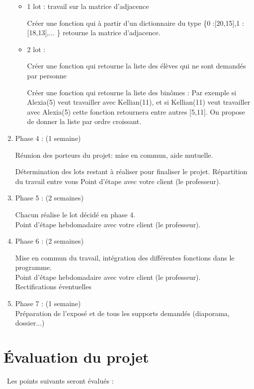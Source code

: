 \documentclass[12pt]{article}
\begin{document}
\begin{enumerate}
\begin{itemize}
\item [\textbullet] 1\ier{} lot : travail sur la matrice d’adjacence

Créer une fonction qui  à partir d’un dictionnaire du type \{0 :[20,15],1 :[18,13],... \} retourne la matrice d’adjacence.

\item [\textbullet] 2\ieme{} lot :

Créer une fonction qui retourne la liste des élèves qui ne sont demandés par personne

Créer une fonction qui retourne la liste des binômes : Par exemple si Alexia(5) veut travailler avec Kellian(11), et si Kellian(11) veut travailler avec Alexia(5) cette fonction retournera entre autres [5,11]. On propose de donner la liste par ordre croissant.



\medskip
\end{itemize}
\item Phase 4 : (1 semaine)  

Réunion des porteurs du projet: mise en commun, aide mutuelle.

Détermination des lots restant à réaliser pour finaliser le projet.  
Répartition du travail entre vous
Point d'étape avec votre client (le professeur).
\medskip

\item Phase 5 : (2 semaines)

Chacun réalise le lot décidé en phase 4.\\
Point d'étape hebdomadaire avec votre client (le professeur).

\medskip

\item Phase 6 : (2 semaines)  

Mise en commun du travail, intégration des différentes fonctions dans le programme.  \\
Point d'étape hebdomadaire avec votre client (le professeur).\\
Rectifications éventuelles

 \medskip

\item Phase 7 : (1 semaine)  \\
Préparation de l'exposé et de tous les supports demandés (diaporama, dossier...)
\end{enumerate}

\section{Évaluation du projet}\
Les points suivants seront évalués : \\
\end{document}
